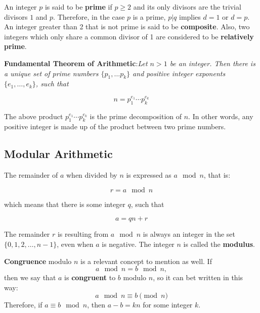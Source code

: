 An integer $p$ is said to be \textbf{prime} if $p\geq 2$ and its only divisors are the trivial divisors $1$ and $p$. Therefore, in the case $p$ is a prime, $p|q$ implies $d=1$ or $d=p$. An integer greater than 2 that is not prime is said to be \textbf{composite}. Also, two integers which only share a common divisor of 1 are considered to be \textbf{relatively prime}.

\textbf{Fundamental Theorem of Arithmetic}:\textit{Let $n > 1$ be an integer. Then there is a unique set of prime numbers $\{p_{1}, \dots p_{k}\}$ and positive integer exponents  $\{e_{1}, \dots , e_{k}\}$, such that}

\begin{equation}
n = p_{1}^{e_{1}} \cdots p_{k}^{e_{k}}
\end{equation}

The above product $p_{1}^{e_{1}} \cdots p_{k}^{e_{k}}$ is the prime decomposition of $n$. In other words, any positive integer is made up of the product between two prime numbers.   

\subsection{Modular Arithmetic}

The remainder of $a$ when divided by $n$ is expressed as $a \mod n$, that is:

\begin{equation}
  r = a \mod n
\end{equation}

which means that there is some integer $q$, such that

\begin{equation}
  a = qn + r
\end{equation}

The remainder $r$ is resulting from $a \mod n$ is always an integer in the set $\{0, 1, 2, \dots, n-1\}$, even when $a$ is negative. The integer $n$ is called the \textbf{modulus}. 

\textbf{Congruence} modulo $n$ is a relevant concept to mention as well. If
\begin{equation}
  a \mod n = b \mod n,
\end{equation}
then we say that $a$ is \textbf{congruent} to $b$ modulo $n$, so it can bet written in this way:
\begin{equation}
a \mod n \equiv b \pmod n
\end{equation}
Therefore, if $a \equiv b \mod n$, then $a-b=kn$ for some integer $k$. 

